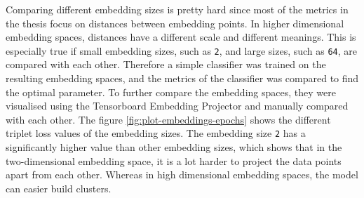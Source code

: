 Comparing different embedding sizes is pretty hard since most of the metrics in the thesis focus on distances between embedding points. In higher dimensional embedding spaces, distances have a different scale and different meanings. This is especially true if small embedding sizes, such as \texttt{2}, and large sizes, such as \texttt{64}, are compared with each other. Therefore a simple classifier was trained on the resulting embedding spaces, and the metrics of the classifier was compared to find the optimal parameter. To further compare the embedding spaces, they were visualised using the Tensorboard Embedding Projector and manually compared with each other.
\newline
\newline
The figure \ref{fig:plot-embeddings-epochs} shows the different triplet loss values of the embedding sizes. The embedding size \texttt{2} has a significantly higher value than other embedding sizes, which shows that in the two-dimensional embedding space, it is a lot harder to project the data points apart from each other. Whereas in high dimensional embedding spaces, the model can easier build clusters.
